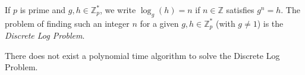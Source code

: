 If $p$ is prime and $g,h \in {\mathbb Z}_p^*$, we write $\log_g(h) = n$ if $n \in {\mathbb Z}$ satisfies $g^n = h$. The problem of finding such an integer $n$ for a given $g,h \in {\mathbb Z}^*_p$ (with $g \neq 1$) is the \emph{Discrete Log Problem}.

\begin{conjecture} There does not exist a polynomial time algorithm to solve the Discrete Log Problem. \end{conjecture}